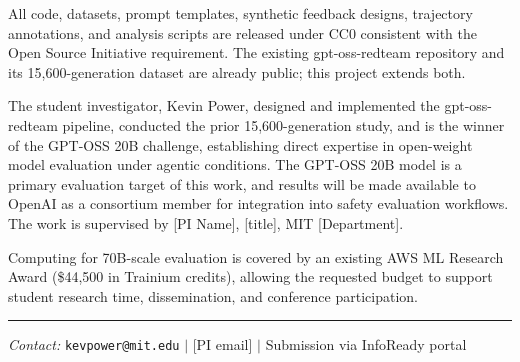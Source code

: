 \documentclass[11pt]{article}
\begin{document}
All code, datasets, prompt templates, synthetic feedback designs, trajectory annotations, and analysis scripts are released under CC0 consistent with the Open Source Initiative requirement. The existing gpt-oss-redteam repository and its 15,600-generation dataset are already public; this project extends both.

The student investigator, Kevin Power, designed and implemented the gpt-oss-redteam pipeline, conducted the prior 15,600-generation study, and is the winner of the GPT-OSS 20B challenge, establishing direct expertise in open-weight model evaluation under agentic conditions. The GPT-OSS 20B model is a primary evaluation target of this work, and results will be made available to OpenAI as a consortium member for integration into safety evaluation workflows. The work is supervised by [PI Name], [title], MIT [Department].

Computing for 70B-scale evaluation is covered by an existing AWS ML Research Award (\$44,500 in Trainium credits), allowing the requested budget to support student research time, dissemination, and conference participation.

\vspace{6pt}\hrule\vspace{6pt}
{\small \textit{Contact:} \texttt{kevpower@mit.edu} $|$ [PI email] $|$ Submission via InfoReady portal}



\end{document}
